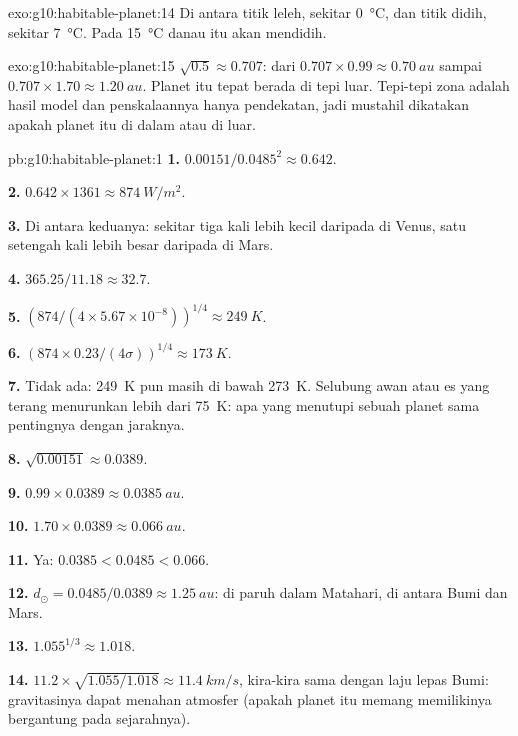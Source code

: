 \begin{solution}{exo:g10:habitable-planet:14}
Di antara titik leleh, sekitar \qty{0}{\degreeCelsius}, dan titik didih,
sekitar \qty{7}{\degreeCelsius}. Pada \qty{15}{\degreeCelsius} danau itu
akan mendidih.
\end{solution}

\begin{solution}{exo:g10:habitable-planet:15}
$\sqrt{0.5} \approx 0.707$: dari $0.707 \times 0.99 \approx \qty{0.70}{au}$
sampai $0.707 \times 1.70 \approx \qty{1.20}{au}$. Planet itu tepat berada di
tepi luar. Tepi-tepi zona adalah hasil model dan penskalaannya hanya
pendekatan, jadi mustahil dikatakan apakah planet itu di dalam atau di luar.
\end{solution}

\begin{solution}{pb:g10:habitable-planet:1}
\textbf{1.} $0.00151/0.0485^2 \approx 0.642$.

\textbf{2.} $0.642 \times 1361 \approx \qty{874}{W/m^2}$.

\textbf{3.} Di antara keduanya: sekitar tiga kali lebih kecil daripada di
Venus, satu setengah kali lebih besar daripada di Mars.

\textbf{4.} $365.25/11.18 \approx 32.7$.

\textbf{5.} $(874/(4 \times 5.67\times10^{-8}))^{1/4} \approx \qty{249}{K}$.

\textbf{6.} $(874 \times 0.23/(4\sigma))^{1/4} \approx \qty{173}{K}$.

\textbf{7.} Tidak ada: \qty{249}{K} pun masih di bawah \qty{273}{K}. Selubung
awan atau es yang terang menurunkan  lebih dari
\qty{75}{K}: apa yang menutupi sebuah planet sama pentingnya dengan jaraknya.

\textbf{8.} $\sqrt{0.00151} \approx 0.0389$.

\textbf{9.} $0.99 \times 0.0389 \approx \qty{0.0385}{au}$.

\textbf{10.} $1.70 \times 0.0389 \approx \qty{0.066}{au}$.

\textbf{11.} Ya: $0.0385 < 0.0485 < 0.066$.

\textbf{12.} $d_\odot = 0.0485/0.0389 \approx \qty{1.25}{au}$: di paruh dalam
 Matahari, di antara Bumi dan Mars.

\textbf{13.} $1.055^{1/3} \approx 1.018$.

\textbf{14.} $11.2 \times \sqrt{1.055/1.018} \approx \qty{11.4}{km/s}$, kira-kira
sama dengan laju lepas Bumi: gravitasinya dapat menahan atmosfer (apakah
planet itu memang memilikinya bergantung pada sejarahnya).


\end{solution}
